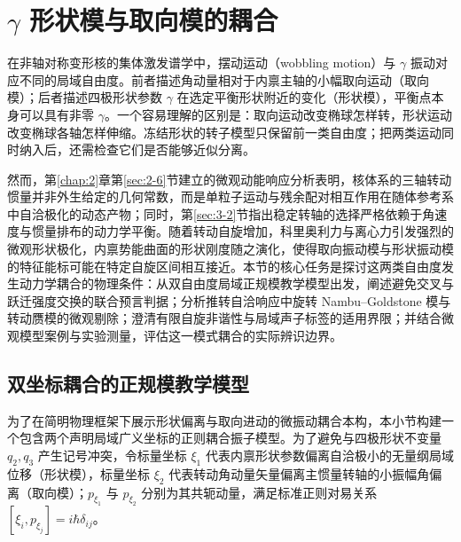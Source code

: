 \section{$\gamma$ 形状模与取向模的耦合}\label{sec:3-6}

在非轴对称变形核的集体激发谱学中，摆动运动（wobbling motion）与 $\gamma$ 振动对应不同的局域自由度。前者描述角动量相对于内禀主轴的小幅取向运动（取向模）；后者描述四极形状参数 $\gamma$ 在选定平衡形状附近的变化（形状模），平衡点本身可以具有非零 $\gamma$。一个容易理解的区别是：取向运动改变椭球怎样转，形状运动改变椭球各轴怎样伸缩。冻结形状的转子模型只保留前一类自由度；把两类运动同时纳入后，还需检查它们是否能够近似分离。

然而，第\ref{chap:2}章第\ref{sec:2-6}节建立的微观动能响应分析表明，核体系的三轴转动惯量并非外生给定的几何常数，而是单粒子运动与残余配对相互作用在随体参考系中自洽极化的动态产物；同时，第\ref{sec:3-2}节指出稳定转轴的选择严格依赖于角速度与惯量排布的动力学平衡。随着转动自旋增加，科里奥利力与离心力引发强烈的微观形状极化，内禀势能曲面的形状刚度随之演化，使得取向振动模与形状振动模的特征能标可能在特定自旋区间相互接近。本节的核心任务是探讨这两类自由度发生动力学耦合的物理条件：从双自由度局域正规模教学模型出发，阐述避免交叉与跃迁强度交换的联合预言判据；分析推转自洽响应中旋转 Nambu--Goldstone 模与转动赝模的微观剔除；澄清有限自旋非谐性与局域声子标签的适用界限；并结合微观模型案例与实验测量，评估这一模式耦合的实际辨识边界。\cite{prochniak-rohozinski-2009-bohr-collective-hamiltonian,matsuzaki-2004-nuclear-inertia-and-wobbling,kvasil-2006-dy156-yb162-crpa-wobbling,doctoral-r1-g37-oi-2001-wobbling-gamma-coupling,doctoral-r1-g37-bhat-2025-microscopic-wobbling-even-even}

\subsection{双坐标耦合的正规模教学模型}\label{sec:3-6-1}

为了在简明物理框架下展示形状偏离与取向进动的微振动耦合本构，本小节构建一个包含两个声明局域广义坐标的正则耦合振子模型。为了避免与四极形状不变量 $q_2, q_3$ 产生记号冲突，令标量坐标 $\xi_1$ 代表内禀形状参数偏离自洽极小的无量纲局域位移（形状模），标量坐标 $\xi_2$ 代表转动角动量矢量偏离主惯量转轴的小振幅角偏离（取向模）；$p_{\xi_1}$ 与 $p_{\xi_2}$ 分别为其共轭动量，满足标准正则对易关系 $[\xi_i, p_{\xi_j}] = i\hbar\delta_{ij}$。

